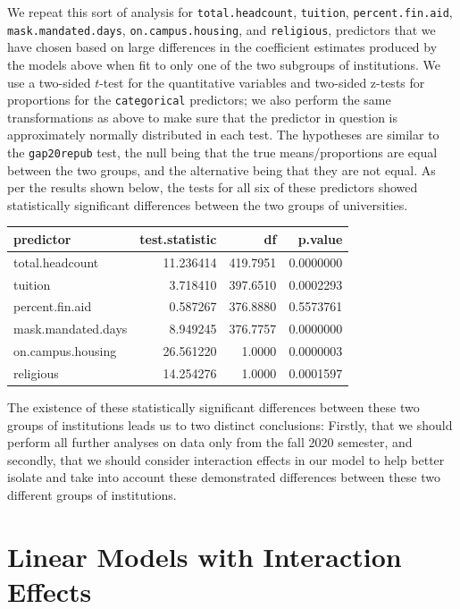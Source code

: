 \documentclass[
]{article}
\begin{document}
We repeat this sort of analysis for \texttt{total.headcount},
\texttt{tuition}, \texttt{percent.fin.aid}, \texttt{mask.mandated.days},
\texttt{on.campus.housing}, and \texttt{religious}, predictors that we
have chosen based on large differences in the coefficient estimates
produced by the models above when fit to only one of the two subgroups
of institutions. We use a two-sided \(t\)-test for the quantitative
variables and two-sided z-tests for proportions for the
\texttt{categorical} predictors; we also perform the same
transformations as above to make sure that the predictor in question is
approximately normally distributed in each test. The hypotheses are
similar to the \texttt{gap20repub} test, the null being that the true
means/proportions are equal between the two groups, and the alternative
being that they are not equal. As per the results shown below, the tests
for all six of these predictors showed statistically significant
differences between the two groups of universities.

\begin{center}

\begin{tabular}{l|r|r|r}
\hline
predictor & test.statistic & df & p.value\\
\hline
total.headcount & 11.236414 & 419.7951 & 0.0000000\\
\hline
tuition & 3.718410 & 397.6510 & 0.0002293\\
\hline
percent.fin.aid & 0.587267 & 376.8880 & 0.5573761\\
\hline
mask.mandated.days & 8.949245 & 376.7757 & 0.0000000\\
\hline
on.campus.housing & 26.561220 & 1.0000 & 0.0000003\\
\hline
religious & 14.254276 & 1.0000 & 0.0001597\\
\hline
\end{tabular}
\end{center}

The existence of these statistically significant differences between
these two groups of institutions leads us to two distinct conclusions:
Firstly, that we should perform all further analyses on data only from
the fall 2020 semester, and secondly, that we should consider
interaction effects in our model to help better isolate and take into
account these demonstrated differences between these two different
groups of institutions.

\hypertarget{linear-models-with-interaction-effects}{%
\section{Linear Models with Interaction
Effects}\label{linear-models-with-interaction-effects}}
\end{document}
